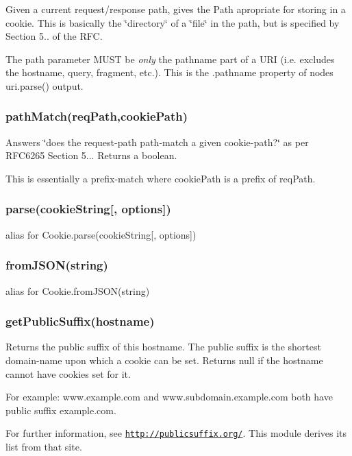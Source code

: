 Given a current request/response path, gives the Path apropriate for storing in a cookie. This is basically the \char`\"{}directory\char`\"{} of a \char`\"{}file\char`\"{} in the path, but is specified by Section 5.. of the R\+FC.

The {\ttfamily path} parameter M\+U\+ST be {\itshape only} the pathname part of a U\+RI (i.\+e. excludes the hostname, query, fragment, etc.). This is the {\ttfamily .pathname} property of node\textquotesingle{}s {\ttfamily uri.\+parse()} output.

\subsubsection*{{\ttfamily path\+Match(req\+Path,cookie\+Path)}}

Answers \char`\"{}does the request-\/path path-\/match a given cookie-\/path?\char`\"{} as per R\+F\+C6265 Section 5... Returns a boolean.

This is essentially a prefix-\/match where {\ttfamily cookie\+Path} is a prefix of {\ttfamily req\+Path}.

\subsubsection*{{\ttfamily parse(cookie\+String\mbox{[}, options\mbox{]})}}

alias for {\ttfamily Cookie.\+parse(cookie\+String\mbox{[}, options\mbox{]})}

\subsubsection*{{\ttfamily from\+J\+S\+O\+N(string)}}

alias for {\ttfamily Cookie.\+from\+J\+S\+O\+N(string)}

\subsubsection*{{\ttfamily get\+Public\+Suffix(hostname)}}

Returns the public suffix of this hostname. The public suffix is the shortest domain-\/name upon which a cookie can be set. Returns {\ttfamily null} if the hostname cannot have cookies set for it.

For example\+: {\ttfamily www.\+example.\+com} and {\ttfamily www.\+subdomain.\+example.\+com} both have public suffix {\ttfamily example.\+com}.

For further information, see \href{http://publicsuffix.org/}{\tt http\+://publicsuffix.\+org/}. This module derives its list from that site.

